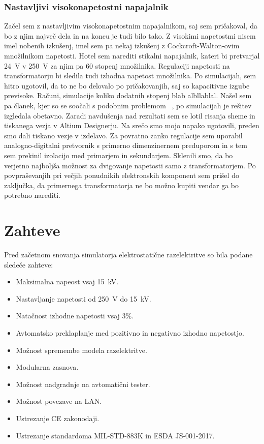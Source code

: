 \documentclass[a4paper,twoside,openright,12pt,slovene]{book}
\begin{document}
	\subsection{Nastavljivi visokonapetostni napajalnik}
	Začel sem z nastavljivim visokonapetostnim napajalnikom, saj sem pričakoval, da bo z njim največ dela in na koncu je tudi bilo tako. Z visokimi napetostmi nisem imel nobenih izkušenj, imel sem pa nekaj izkušenj z Cockcroft-Walton-ovim množilnikom napetosti. Hotel sem narediti stikalni napajalnik, kateri bi pretvarjal \SI{24}{\volt} v \SI{250}{\volt} za njim pa 60 stopenj množilnika. Regulaciji napetosti na transformatorju bi sledila tudi izhodna napetost množilnika. Po simulacijah, sem hitro ugotovil, da to ne bo delovalo po pričakovanjih, saj so kapacitivne izgube previsoke. Računi, simulacije koliko dodatnih stopenj blab albllablal. Našel sem pa članek, kjer so se soočali s podobnim problemom ~\cite{Using Parallel High Voltage Multipliers for 100kV Downhole Neutron Generator Power Supplies}, po simulacijah je rešitev izgledala obetavno. Zaradi navdušenja nad rezultati sem se lotil risanja sheme in tiskanega vezja v Altium Designerju. Na srečo smo mojo napako ugotovili, preden smo dali tiskano vezje v izdelavo. Za povratno zanko regulacije sem uporabil analogno-digitalni pretvornik s primerno dimenzinernem preduporom in s tem sem prekinil izolacijo med primarjem in sekundarjem. Sklenili smo, da bo verjetno najboljša možnost za dvigovanje napetosti samo z transformatorjem. Po povpraševanjih pri večjih ponudnikih elektronskih komponent sem prišel do zaključka, da primernega transformatorja ne bo možno kupiti vendar ga bo potrebno narediti.


\chapter{Zahteve} \label{Zahteve}

Pred začetnom snovanja simulatorja elektrostatične razelektritve so bila podane sledeče zahteve:
\begin{itemize}
\item Maksimalna napeost vsaj \SI{15}{\kilo\volt}.
\item Nastavljanje napetosti od \SI{250}{\volt} do \SI{15}{\kilo\volt}.
\item Natačnost izhodne napetosti vsaj 3\%.
\item Avtomatsko preklaplanje med pozitivno in negativno izhodno napetostjo.
\item Možnost spremembe modela razelektritve.
\item Modularna zasnova.
\item Možnost nadgradnje na avtomatični tester.
\item Možnost povezave na LAN.
\item Ustrezanje CE zakonodaji.
\item Ustrezanje standardoma MIL-STD-883K in ESDA JS-001-2017.
\end{itemize}
\end{document}
